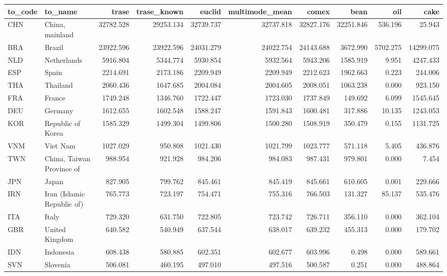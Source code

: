 \begin{table}[ht]
\centering
\begin{tabular}{llrrrrrrrr}
  \hline
to\_code & to\_name & trase & trase\_known & euclid & multimode\_mean & comex & bean & oil & cake \\ 
  \hline
CHN & China, mainland & 32782.528 & 29253.134 & 32739.737 & 32737.818 & 32827.176 & 32251.846 & 536.196 & 25.943 \\ 
  BRA & Brazil & 23922.596 & 23922.596 & 24031.279 & 24022.754 & 24143.688 & 3672.990 & 5702.275 & 14299.075 \\ 
  NLD & Netherlands & 5916.804 & 5344.774 & 5930.854 & 5932.564 & 5943.206 & 1585.919 & 9.951 & 4247.433 \\ 
  ESP & Spain & 2214.691 & 2173.186 & 2209.949 & 2209.949 & 2212.623 & 1962.663 & 0.223 & 244.006 \\ 
  THA & Thailand & 2060.436 & 1647.685 & 2004.084 & 2004.605 & 2008.051 & 1063.238 & 0.000 & 923.150 \\ 
  FRA & France & 1749.248 & 1346.760 & 1722.447 & 1723.030 & 1737.849 & 149.692 & 6.099 & 1545.645 \\ 
  DEU & Germany & 1612.655 & 1602.548 & 1588.247 & 1591.843 & 1600.481 & 317.886 & 10.135 & 1243.053 \\ 
  KOR & Republic of Korea & 1585.329 & 1499.304 & 1499.806 & 1500.280 & 1508.919 & 350.479 & 0.155 & 1131.725 \\ 
  VNM & Viet Nam & 1027.029 & 950.808 & 1021.430 & 1021.799 & 1023.777 & 571.118 & 5.405 & 436.876 \\ 
  TWN & China, Taiwan Province of & 988.954 & 921.928 & 984.206 & 984.083 & 987.431 & 979.801 & 0.000 & 7.454 \\ 
  JPN & Japan & 827.905 & 799.762 & 845.461 & 845.419 & 845.661 & 610.605 & 0.001 & 229.666 \\ 
  IRN & Iran (Islamic Republic of) & 765.773 & 723.197 & 754.471 & 755.316 & 766.503 & 131.327 & 85.137 & 535.476 \\ 
  ITA & Italy & 729.320 & 631.750 & 722.805 & 723.742 & 726.711 & 356.110 & 0.000 & 362.104 \\ 
  GBR & United Kingdom & 640.582 & 540.949 & 637.544 & 638.017 & 639.232 & 455.313 & 0.000 & 179.702 \\ 
  IDN & Indonesia & 608.438 & 580.885 & 602.351 & 602.677 & 603.996 & 0.498 & 0.000 & 589.661 \\ 
  SVN & Slovenia & 506.081 & 460.195 & 497.010 & 497.516 & 500.587 & 0.251 & 0.000 & 488.864 \\ 

\end{tabular}
\end{table}
